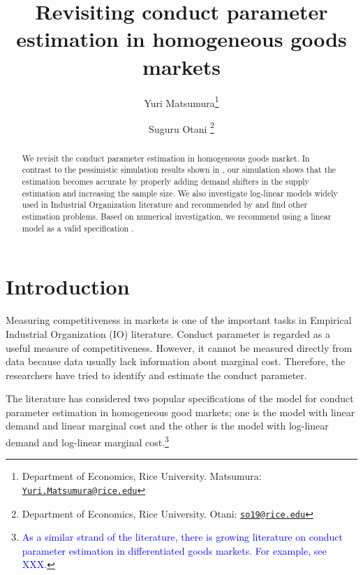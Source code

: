 \documentclass[11pt, a4paper]{article}
\title{Revisiting conduct
parameter estimation in homogeneous goods markets}
\author{Yuri Matsumura\footnote{Department of Economics, Rice University. Matsumura: \texttt{\href{mailto:Yuri.Matsumura@rice.edu}{Yuri.Matsumura@rice.edu}}} \and Suguru Otani \footnote{Department of Economics, Rice University. Otani: \texttt{\href{mailto:so19@rice.edu}{so19@rice.edu}}}}
\begin{document}
\maketitle

\begin{abstract}
    We revisit the conduct parameter estimation in homogeneous goods market. In contrast to the pessimistic simulation results shown in \cite{perloff2012collinearity}, our simulation shows that the estimation becomes accurate by properly adding demand shifters in the supply estimation and increasing the sample size. We also investigate log-linear models widely used in Industrial Organization literature and recommended by \cite{perloff2012collinearity} and find other estimation problems. Based on numerical investigation, we recommend using a linear model as a valid specification . %
\end{abstract}

\section{Introduction}
Measuring competitiveness in markets is one of the important tasks in Empirical Industrial Organization (IO) literature.
Conduct parameter is regarded as a useful measure of competitiveness. 
However, it cannot be measured directly from data because data usually lack information about marginal cost.
Therefore, the researchers have tried to identify and estimate the conduct parameter.

The literature has considered two popular specifications of the model for conduct parameter estimation in homogeneous good markets; one is the model with linear demand and linear marginal cost and the other is the model with log-linear demand and log-linear marginal cost.\footnote{\textcolor{blue}{As a similar strand of the literature, there is growing literature on conduct parameter estimation in differentiated goods markets. For example, see XXX.}}
\end{document}
